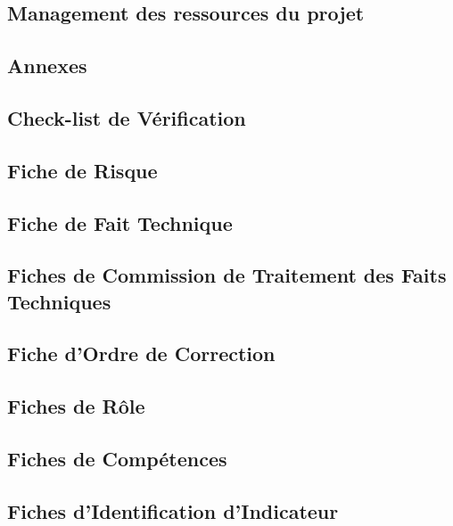 \documentclass[asi]{picINSA}
\begin{document}
\chapter{Management des ressources du projet}
\label{ressources}

 
\begin{appendix}
\part*{Annexes}

\chapter{Check-list de Vérification}
\label{annexeCheckList}
	
\chapter{Fiche de Risque}
\label{annexeFRi}

\chapter{Fiche de Fait Technique}
\label{annexeFFT}


\chapter{Fiches de Commission de Traitement des Faits Techniques}
\label{annexeFCTFT}

\chapter{Fiche d'Ordre de Correction}
\label{annexeFOC}


\chapter{Fiches de Rôle}
\label{annexeFRo}
	

\chapter{Fiches de Compétences}
\label{annexeFC}


\chapter{Fiches d'Identification d'Indicateur}
\label{annexeFichesIdentificationIndicateur}


\end{appendix}
\end{document}
